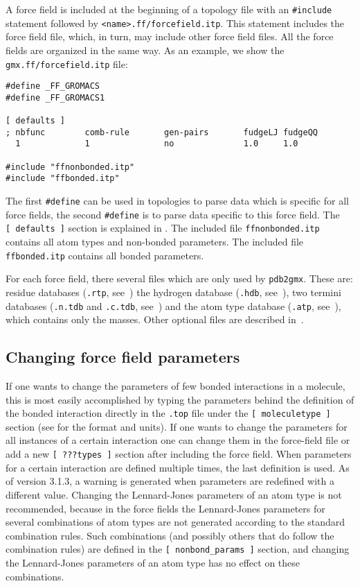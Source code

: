 A force field is included at the beginning of a topology file with an
{\tt \#include} statement followed by {\tt <name>.ff/forcefield.itp}.
This statement includes the force field file,
which, in turn, may include other force field files. All the force fields
are organized in the same way. As an example, we show the {\tt gmx.ff/forcefield.itp}
file:

{\small
\begin{verbatim}
#define _FF_GROMACS
#define _FF_GROMACS1

[ defaults ]
; nbfunc        comb-rule       gen-pairs       fudgeLJ fudgeQQ
  1             1               no              1.0     1.0

#include "ffnonbonded.itp"
#include "ffbonded.itp"
\end{verbatim}}

The first {\tt \#define} can be used in topologies to parse data which is
specific for all {\gromacs} force fields, the second {\tt \#define} is to parse
data specific to this force field. The {\tt [~defaults~]} section is
explained in . The included file {\tt ffnonbonded.itp} contains
all atom types and non-bonded parameters. The included file {\tt ffbonded.itp}
contains all bonded parameters.

For each force field, there several files which are only used by {\tt pdb2gmx}.
These are: residue databases ({\tt .rtp}, see~)
the hydrogen database ({\tt .hdb}, see~), two termini databases
({\tt .n.tdb} and {\tt .c.tdb}, see~) and
the atom type database ({\tt .atp}, see~), which contains only the masses.  Other optional
files are described in~.


\subsection{Changing force field parameters
}
If one wants to change the parameters of few bonded interactions in
a molecule, this is most easily accomplished by typing the parameters
behind the definition of the bonded interaction directly in the {\tt *.top} file 
under the {\tt [~moleculetype~]} section (see  for the format
and units).
If one wants to change the parameters for all instances of a certain
interaction one can change them in the force-field file or add a
new {\tt [~???types~]} section after including the force field.
When parameters for a certain interaction are defined multiple times,
the last definition is used. As of {\gromacs} version 3.1.3, a warning is
generated when parameters are redefined with a different value.
Changing the Lennard-Jones parameters of an atom type is not
recommended, because in the {\gromos} force fields
the Lennard-Jones parameters for several combinations of atom types
are not generated according to the standard combination rules.
Such combinations (and possibly others that do follow the
combination rules) are defined in the {\tt [~nonbond_params~]}
section, and changing the Lennard-Jones parameters of an atom type
has no effect on these combinations.

